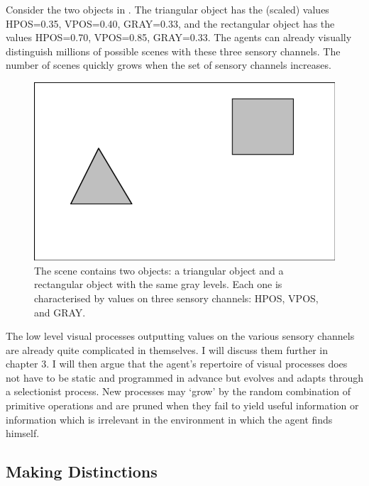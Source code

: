 Consider the two objects in . The triangular
object has the (scaled) values HPOS=0.35, VPOS=0.40, GRAY=0.33, and 
the rectangular object has the values HPOS=0.70, VPOS=0.85, 
GRAY=0.33. The agents can already visually distinguish
millions of possible scenes with these three sensory
channels. The number of scenes
quickly grows when the set of sensory channels increases. 
\begin{figure}[htbp]
  \centerline{\includegraphics[width=.50\textwidth]{chap2/figs/scene1-1}}
\caption{\label{scene1-1} The scene contains two 
objects: a triangular object and a rectangular object
with the same gray levels. 
Each one is characterised by values on three sensory 
channels: HPOS, VPOS, and GRAY.}
\end{figure}

The low level visual processes outputting
values on the various sensory channels are already quite
complicated in themselves. I will discuss them further in 
chapter 3. I will then argue that the 
agent's repertoire of visual processes does not have to be
static and programmed in advance but evolves and adapts
through a selectionist process. New processes may `grow'
by the random combination of primitive operations and are
pruned when they fail to yield useful information or information 
which is irrelevant in the environment in which the agent 
finds himself. 

\subsection{Making Distinctions}

